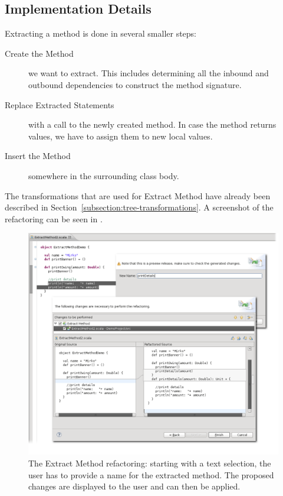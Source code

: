 \documentclass[10pt,a4paper,oneside]{scrreprt}
\begin{document}
\subsection{Implementation Details}

Extracting a method is done in several smaller steps:

\begin{description}
  \item[Create the Method] we want to extract. This includes determining all the inbound and outbound dependencies to construct the method signature.
  \item[Replace Extracted Statements] with a call to the newly created method. In case the method returns values, we have to assign them to new local values.
  \item[Insert the Method] somewhere in the surrounding class body.
\end{description}

The transformations that are used for Extract Method have already been described in Section~\vref{subsection:tree-transformations}. A screenshot of the refactoring can be seen in .

\begin{figure}
  \centering
  \includegraphics[width=\linewidth]{extract_method_screenshot_1.png}
  \caption{The Extract Method refactoring: starting with a text selection, the user has to provide a name for the extracted method. The proposed changes are displayed to the user and can then be applied.}
  \label{figure:extract-method-screenshot-1}
\end{figure}
\end{document}
